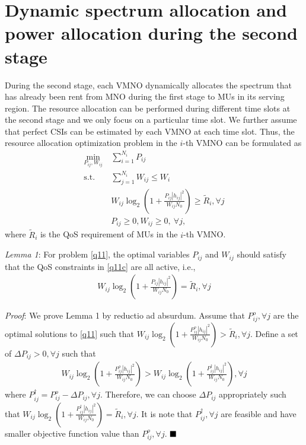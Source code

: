 \documentclass[journal]{IEEEtran}
\begin{document}
\section{Dynamic spectrum allocation and power allocation during the second stage}
During the second stage, each VMNO dynamically allocates the spectrum that has already been rent from MNO during the first stage to MUs in its serving region. The resource allocation can be performed during different time slots at the second stage and we only focus on a particular time slot. We further assume that perfect CSIs can be estimated by each VMNO at each time slot. Thus, the resource allocation optimization problem in the $i$-th VMNO can be formulated as
\begin{subequations}\label{q11}
	\begin{align}
	\min_{P_{ij}, W_{ij}}\ & \sum\limits_{i = 1}^{N_i} P_{ij} \label{q11a} \\ \mbox{s.t.} \quad &  \sum\limits_{j = 1}^{N_i} W_{ij} \leq W_i \label{q11b} \\ \quad &  W_{ij}\log_2\left(1 + \frac{P_{ij}\left|h_{ij}\right|^2}{W_{ij}N_0}\right) \geq \tilde{R}_i, \forall j \label{q11c}\\
	& P_{ij} \geq 0, W_{ij} \geq 0, \ \forall j, \label{q11d}
	\end{align}
\end{subequations}
where $\tilde{R}_i$ is the QoS requirement of MUs in the $i$-th VMNO.

\textit{Lemma 1}: For problem \eqref{q11}, the optimal variables $P_{ij}$ and $W_{ij}$ should satisfy that the QoS constraints in \eqref{q11c} are all active, i.e., 
\begin{align}
W_{ij}\log_2\left(1 + \frac{P_{ij}\left|h_{ij}\right|^2}{W_{ij}N_0}\right) = \tilde{R}_i,  \forall j
\end{align}

\textit{Proof}:  
We prove Lemma 1 by reductio ad absurdum. Assume that $P_{ij}^o, \forall j$ are the optimal solutions to \eqref{q11} such that $W_{ij}\log_2\left(1 + \frac{P_{ij}^o\left|h_{ij}\right|^2}{W_{ij}N_0}\right) > \tilde{R}_i, \forall j$. Define a set of $\Delta P_{ij} > 0, \forall j$ such that 
\begin{align}
W_{ij}\log_2\left(1 + \frac{P_{ij}^o\left|h_{ij}\right|^2}{W_{ij}N_0}\right) > W_{ij}\log_2\left(1 + \frac{P_{ij}^\dag\left|h_{ij}\right|^2}{W_{ij}N_0}\right), \forall j
\end{align}
where $P_{ij}^\dag = P_{ij}^o - \Delta P_{ij}, \forall j$. Therefore, we can choose $\Delta P_{ij}$ appropriately such that $W_{ij}\log_2\left(1 + \frac{P_{ij}^\dag\left|h_{ij}\right|^2}{W_{ij}N_0}\right) = \tilde{R}_i, \forall j$. It is note that $P_{ij}^\dag, \forall j$ are feasible and have smaller objective function value than $P_{ij}^o, \forall j$.
$\hfill\blacksquare$
\end{document}
